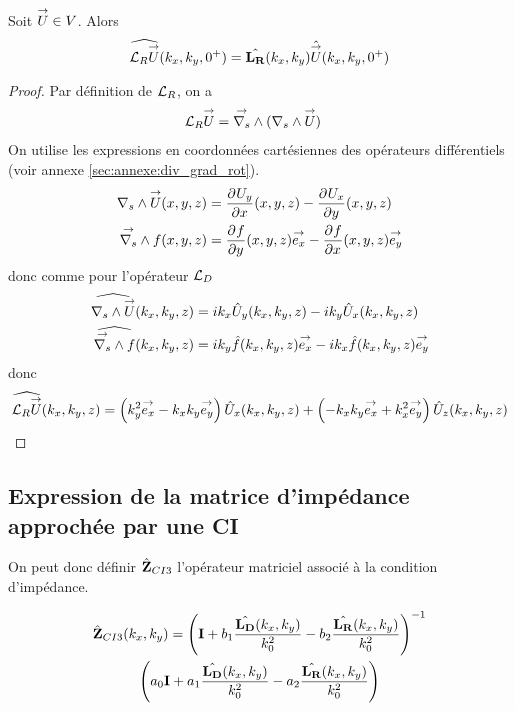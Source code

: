     \begin{prop}
      Soit \(\vect{U} \in V\).
      Alors
      \begin{equation*}
        \widehat{\LR \vect{U}} (k_x,k_y,0^+) = \hat{\mLR}(k_x,k_y) \hat{\vect{U}}(k_x,k_y,0^+)
      \end{equation*}
    \end{prop}

    \begin{proof}
      Par définition de \(\LR\), on a
      \begin{align*}
        \LR \vect{U} & = \vrots{} (\rots{} \vect{U})
      \end{align*}
      On utilise les expressions en coordonnées cartésiennes des opérateurs différentiels (voir annexe \ref{sec:annexe:div_grad_rot}).
      \begin{align*}
        \rots{\vect{U}}(x,y,z) &= \ddr{x}{U_y}(x,y,z) - \ddr{y}{U_x}(x,y,z)
        \\
        \vrots{f}(x,y,z) &= \ddr{y}{f}(x,y,z)\vect{e_x} - \ddr{x}{f}(x,y,z)\vect{e_y}
      \end{align*}
      donc comme pour l'opérateur \(\LD\)
      \begin{align*}
        \widehat{\rots{\vect{U}}}(k_x,k_y,z) &= ik_x{\hat{U}_y}(k_x,k_y,z) - ik_y{\hat{U}_x}(k_x,k_y,z)
        \\
        \widehat{\vrots{f}}(k_x,k_y,z) &=  ik_y\hat{f}(k_x,k_y,z)\vect{e_x} - ik_x\hat{f}(k_x,k_y,z)\vect{e_y}
      \end{align*}
      donc
      \begin{align*}
        \widehat{\LR{\vect{U}}}(k_x,k_y,z) =  \left({k_y^2}\vect{e_x} -k_xk_y\vect{e_y}\right){\hat{U}_x}(k_x,k_y,z) + \left(-k_xk_y\vect{e_x} + k_x^2\vect{e_y}\right){\hat{U}_z}(k_x,k_y,z)
      \end{align*}
    \end{proof}

  \subsection{Expression de la matrice d'impédance approchée par une CI}

    On peut donc définir \(\hat{\mZ}_{CI3}\) l’opérateur matriciel associé à la condition d'impédance.

    \begin{multline}
      \label{eq:plan:hoibc:ci3}
      \hat{\mZ}_{CI3}(k_x,k_y) = \left(\mI + b_1 \frac{\hat{\mLD}(k_x,k_y)}{k_0^2} - b_2 \frac{\hat{\mLR}(k_x,k_y)}{k_0^2} \right)^{-1}\\\left(a_0 \mI + a_1 \frac{\hat{\mLD}(k_x,k_y)}{k_0^2} - a_2 \frac{\hat{\mLR}(k_x,k_y)}{k_0^2}\right)
    \end{multline}


